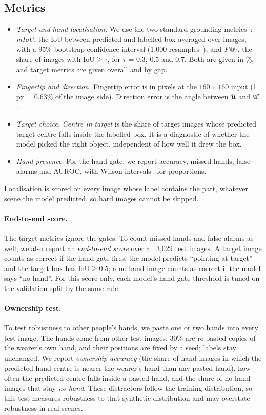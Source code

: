 \subsection{Metrics}\label{sec:metrics}
\begin{itemize}
\item \emph{Target and hand localisation.} We use the two standard grounding metrics~\cite{egopoint,li2026vistaref,li2026pointvgr}: \emph{mIoU}, the IoU between predicted and labelled box averaged over images, with a 95\% bootstrap confidence interval (1,000 resamples~\cite{efron1994introduction}), and \emph{P@$\tau$}, the share of images with IoU${\geq}\tau$, for $\tau$ = 0.3, 0.5 and 0.7. Both are given in \%, and target metrics are given overall and by gap.
\item \emph{Fingertip and direction.} Fingertip error is in pixels at the $160\times160$ input (1\,px = 0.63\% of the image side). Direction error is the angle between $\hat{\mathbf{u}}$ and $\mathbf{u}^\star$.
\item \emph{Target choice.} \emph{Centre in target} is the share of target images whose predicted target centre falls inside the labelled box. It is a diagnostic of whether the model picked the right object, independent of how well it drew the box.
\item \emph{Hand presence.} For the hand gate, we report accuracy, missed hands, false alarms and AUROC, with Wilson intervals~\cite{wilson1927probable} for proportions.
\end{itemize}
Localisation is scored on every image whose label contains the part, whatever scene the model predicted, so hard images cannot be skipped.

\paragraph{End-to-end score.} The target metrics ignore the gates. To count missed hands and false alarms as well, we also report an \emph{end-to-end score} over all 3,029 test images. A target image counts as correct if the hand gate fires, the model predicts ``pointing at target'' and the target box has IoU${\geq}0.5$; a no-hand image counts as correct if the model says ``no hand''. For this score only, each model's hand-gate threshold is tuned on the validation split by the same rule.

\paragraph{Ownership test.} To test robustness to other people's hands, we paste one or two hands into every test image. The hands come from other test images, 30\% are re-pasted copies of the wearer's own hand, and their positions are fixed by a seed; labels stay unchanged. We report \emph{ownership accuracy} (the share of hand images in which the predicted hand centre is nearer the wearer's hand than any pasted hand), how often the predicted centre falls inside a pasted hand, and the share of no-hand images that stay \emph{no hand}. These distractors follow the training distribution, so this test measures robustness to that synthetic distribution and may overstate robustness in real scenes.

